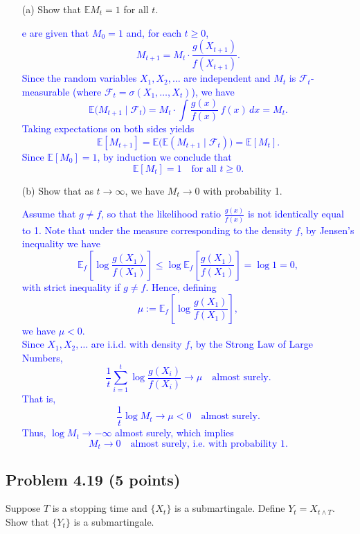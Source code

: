 \documentclass{article}
\begin{document}
\begin{enumerate}
    \item[(a)] Show that $\mathbb{E}M_t = 1$ for all $t$.

    \textcolor{blue}{e are given that $M_0 = 1$ and, for each $t \ge 0$, 
\[
M_{t+1} = M_t \cdot \frac{g(X_{t+1})}{f(X_{t+1})}.
\]
Since the random variables $X_1, X_2, \ldots$ are independent and $M_t$ is $\mathcal{F}_t$-measurable (where $\mathcal{F}_t=\sigma(X_1,\ldots,X_t)$), we have
\[
\mathbb{E}\bigl(M_{t+1}\mid\mathcal{F}_t\bigr) 
= M_t \cdot \int \frac{g(x)}{f(x)}\, f(x) \,dx 
= M_t.
\]
Taking expectations on both sides yields
\[
\mathbb{E}[M_{t+1}] = \mathbb{E}\bigl(\mathbb{E}(M_{t+1}\mid\mathcal{F}_t)\bigr) = \mathbb{E}[M_t].
\]
Since $\mathbb{E}[M_0]=1$, by induction we conclude that
\[
\mathbb{E}[M_t]=1 \quad \text{for all } t\ge0.
\]}

    \item[(b)] Show that as $t \to \infty$, we have $M_t \to 0$ with probability 1.

    \textcolor{blue}{
        Assume that $g \neq f$, so that the likelihood ratio $\frac{g(x)}{f(x)}$ is not identically equal to 1. Note that under the measure corresponding to the density $f$, by Jensen's inequality we have
\[
\mathbb{E}_f\!\left[\log\frac{g(X_1)}{f(X_1)}\right] 
\le \log\mathbb{E}_f\!\left[\frac{g(X_1)}{f(X_1)}\right] 
=\log 1 = 0,
\]
with strict inequality if $g\neq f$. Hence, defining
\[
\mu := \mathbb{E}_f\!\left[\log\frac{g(X_1)}{f(X_1)}\right],
\]
we have $\mu < 0$. \\
Since $X_1, X_2, \ldots$ are i.i.d. with density $f$, by the Strong Law of Large Numbers,
\[
\frac{1}{t}\sum_{i=1}^t \log\frac{g(X_i)}{f(X_i)} \to \mu \quad \text{almost surely}.
\]
That is,
\[
\frac{1}{t}\log M_t \to \mu < 0 \quad \text{almost surely}.
\]
Thus, $\log M_t \to -\infty$ almost surely, which implies
\[
M_t \to 0 \quad \text{almost surely, i.e. with probability 1}.
\]}

\end{enumerate}


\subsection*{Problem 4.19 (5 points)}
Suppose $T$ is a stopping time and $\{X_t\}$ is a submartingale. Define $Y_t = X_{t \wedge T}$. Show that $\{Y_t\}$ is a submartingale.
\end{document}
